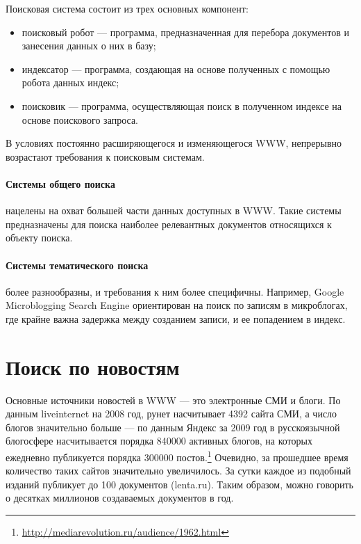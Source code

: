 Поисковая система состоит из трех основных компонент: 
\begin{itemize}
 \item поисковый робот --- программа, предназначенная для перебора документов и
занесения данных о них в базу;
 \item индексатор --- программа, создающая на основе полученных с помощью робота данных индекс;
 \item поисковик --- программа, осуществляющая поиск в полученном индексе на основе поискового запроса.
\end{itemize} В условиях постоянно расширяющегося и изменяющегося WWW, непрерывно
возрастают требования к поисковым системам. 

\paragraph{Системы общего поиска} нацелены на охват большей части данных
доступных в WWW. Такие системы предназначены для поиска наиболее релевантных
документов относящихся к объекту поиска. 
\paragraph{Системы тематического поиска} более разнообразны, и требования к ним более специфичны.
 Например, Google Microblogging Search Engine ориентирован на поиск по записям в микроблогах,
где крайне важна задержка между созданием записи, и ее попадением в индекс.

\section{Поиск по новостям}

Основные источники новостей в WWW --- это электронные СМИ и блоги. По данным
liveinternet на 2008 год, рунет насчитывает 4392 сайта СМИ,
 а число блогов значительно больше --- по данным Яндекс за 2009 год в русскоязычной блогосфере насчитывается порядка 840000 активных блогов, 
на которых ежедневно публикуется порядка 300000 постов.\footnote{\href{http://mediarevolution.ru/audience/1962.html}{http://mediarevolution.ru/audience/1962.html}}
Очевидно, за прошедшее время количество таких сайтов значительно увеличилось. За сутки каждое
из подобный изданий публикует до 100 документов (lenta.ru). Таким образом, 
можно говорить о десятках миллионов создаваемых документов в год.


